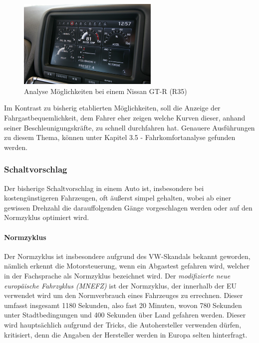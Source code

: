 \begin{figure}[!htb]\centering
	\includegraphics[width=0.6\textwidth]{images/gtrMultifunc}
	\caption{Analyse Möglichkeiten bei einem Nissan GT-R (R35) \cite{SIMR.CH1-Fahrstil-Analyse.GTRMultifunc}}\label{Fig:imgGTR}
\end{figure}

Im Kontrast zu bisherig etablierten Möglichkeiten, soll die Anzeige der Fahrgastbequemlichkeit, dem Fahrer eher zeigen welche Kurven dieser, anhand seiner Beschleunigungskräfte, zu schnell durchfahren hat. Genauere Ausführungen zu diesem Thema, können unter Kapitel 3.5 - Fahrkomfortanalyse gefunden werden.

\subsubsection{Schaltvorschlag}
Der bisherige Schaltvorschlag in einem Auto ist, insbesondere bei kostengünstigeren Fahrzeugen, oft äußerst simpel gehalten, wobei ab einer gewissen Drehzahl die darauffolgenden Gänge vorgeschlagen werden oder auf den Normzyklus optimiert wird. \cite{SIMR.CH1-Fahrstil-Analyse.Schaltempfehlung} 
\paragraph{Normzyklus}
Der Normzyklus ist insbesondere aufgrund des VW-Skandals bekannt geworden, nämlich erkennt die Motorsteuerung, wenn ein Abgastest gefahren wird, welcher in der Fachsprache als Normzyklus bezeichnet wird. \cite{SIMR.CH1-fahrstil-analyse.Normzyklus} Der \textit{modifizierte neue europäische Fahrzyklus (MNEFZ)} ist der Normzyklus, der innerhalb der EU verwendet wird um den Normverbrauch eines Fahrzeuges zu errechnen. Dieser umfasst insgesamt 1180 Sekunden, also fast 20 Minuten, wovon 780 Sekunden unter Stadtbedingungen und 400 Sekunden über Land gefahren werden. Dieser wird hauptsächlich aufgrund der Tricks, die Autohersteller verwenden dürfen, kritisiert, denn die Angaben der Hersteller werden in Europa selten hinterfragt. \cite{SIMR.CH1-fahrstil-analyse.MNEFZ}
